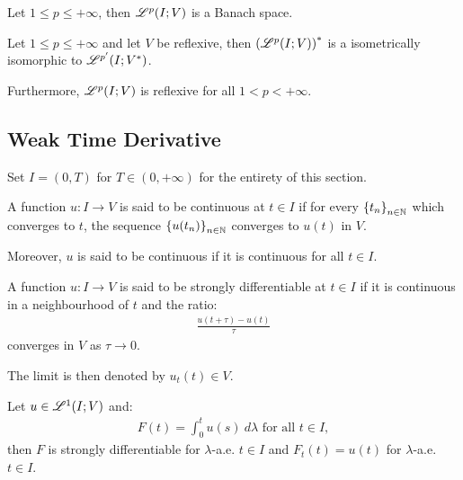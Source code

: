 \begin{theorem}
    Let $1 \leq p \leq +\infty$, then $\mathscr{L}^{p}(I; V)$ is a Banach space.
\end{theorem}

\begin{theorem}
    Let $1 \leq p \leq +\infty$ and let $V$ be reflexive, then $\left( \mathscr{L}^{p}(I; V) \right)^{*}$ is a isometrically isomorphic to $\mathscr{L}^{p^{\prime}}(I; V^{*})$.

    Furthermore, $\mathscr{L}^{p}(I; V)$ is reflexive for all $1 < p < +\infty$.
\end{theorem}

\newpage
\subsection{Weak Time Derivative}

Set $I = (0, T)$ for $T \in (0, +\infty)$ for the entirety of this section.

\begin{definition}[Continuity]
    A function $u\colon I \rightarrow V$ is said to be continuous at $t \in I$ if for every $\left\{ t_n \right\}_{n \in \mathbb{N}}$ which converges to $t$, the sequence $\left\{ u(t_n) \right\}_{n \in \mathbb{N}}$ converges to $u(t)$ in $V$.

    Moreover, $u$ is said to be continuous if it is continuous for all $t \in I$.
\end{definition}

\begin{definition}
    A function $u\colon I \rightarrow V$ is said to be strongly differentiable at $t \in I$ if it is continuous in a neighbourhood of $t$ and the ratio:
    \begin{gather}
        \frac{u(t + \tau) - u(t)}{\tau}
    \end{gather}
    converges in $V$ as $\tau \rightarrow 0$.

    The limit is then denoted by $u_t(t) \in V$.
\end{definition}

\begin{theorem}
    Let $u \in \mathscr{L}^{1}(I; V)$ and:
    \begin{gather}
        F(t) = \int_0^t u(s) ~ d \lambda \text{ for all } t \in I,
    \end{gather}
    then $F$ is strongly differentiable for $\lambda$-a.e. $t \in I$ and $F_t(t) = u(t)$ for $\lambda$-a.e. $t \in I$.
\end{theorem}

